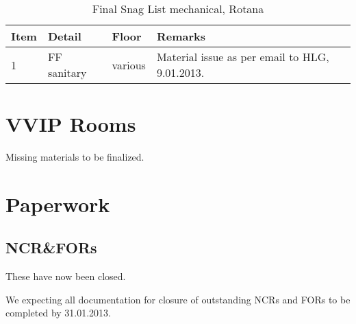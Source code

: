 \begin{table}[htbp]
\begin{tabular}{lllp{4.5cm}}
\toprule
Item &Detail &Floor  & Remarks\\
\midrule
1 &FF sanitary &various & Material issue as per email to HLG, 9.01.2013. \\
\bottomrule
\end{tabular}
\caption{Final Snag List mechanical, Rotana}

\end{table}

\section{VVIP Rooms}

Missing materials to be finalized.


\section{Paperwork}

\subsection{NCR\&FORs}

These have now been closed. 

\begin{comment}
\begin{table}[htbp]
\small
\begin{tabular}{lp{3.5cm}llp{2.5cm}}
\toprule
Item &NCR & Levels & Status &Remarks\\ 
\midrule
1    &Fire alarm cables and belden cables pulled in same cable tray and CCTV without containment inside ELV room. 
& all & &superceded by events, due to new EI.\\
\bottomrule
\end{tabular}
\caption{List of outstanding electrical NCRs, Rotana Tower}
\end{table}
\end{comment}

We expecting all documentation for closure of outstanding NCRs and FORs to be completed by 31.01.2013.
















